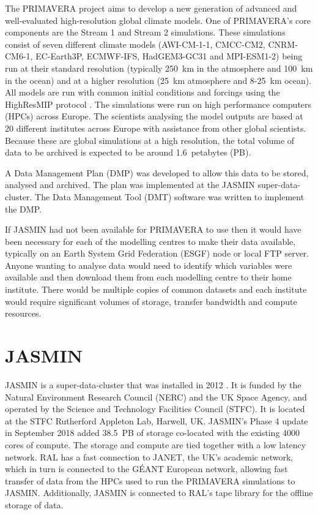 \documentclass[gmd, manuscript]{copernicus}
\begin{document}


\introduction  %

The PRIMAVERA project aims to develop a new generation of advanced and well-evaluated high-resolution global climate models. One of PRIMAVERA's core components are the Stream 1 and Stream 2 simulations. These simulations consist of seven different climate models (AWI-CM-1-1, CMCC-CM2, CNRM-CM6-1, EC-Earth3P, ECMWF-IFS, HadGEM3-GC31 and MPI-ESM1-2) being run at their standard resolution (typically  250~km in the atmosphere and 100~km in the ocean) and at a higher resolution (25~km atmosphere and 8-25~km ocean). All models are run with common initial conditions and forcings using the HighResMIP protocol \citep{Haarsma2016}. The simulations were run on high performance computers (HPCs) across Europe. The scientists analysing the model outputs are based at 20 different institutes across Europe with assistance from other global scientists. Because these are global simulations at a high resolution, the total volume of data to be archived is expected to be around 1.6~petabytes (PB).

A Data Management Plan (DMP) was developed to allow this data to be stored, analysed and archived. The plan was implemented at the JASMIN super-data-cluster. The Data Management Tool (DMT) software was written to implement the DMP.

If JASMIN had not been available for PRIMAVERA to use then it would have been necessary for each of the modelling centres to make their data available, typically on an Earth System Grid Federation (ESGF) node or local FTP server. Anyone wanting to analyse data would need to identify which variables were available and then download them from each modelling centre to their home institute. There would be multiple copies of common datasets and each institute would require significant volumes of storage, transfer bandwidth and compute resources.

\section{JASMIN}

JASMIN is a super-data-cluster that was installed in 2012 \citep{lawrence2013storing}. It is funded by the Natural Environment Research Council (NERC) and the UK Space Agency, and operated by the Science and Technology Facilities Council (STFC). It is located at the STFC Rutherford Appleton Lab, Harwell, UK. JASMIN's Phase 4 update in September 2018 added 38.5~PB of storage co-located with the existing 4000 cores of compute. The storage and compute are tied together with a low latency network. RAL has a fast connection to JANET, the UK's academic network, which in turn is connected to the G\'{E}ANT European network, allowing fast transfer of data from the HPCs used to run the PRIMAVERA simulations to JASMIN. Additionally, JASMIN is connected to RAL's tape library for the offline storage of data.
\end{document}

